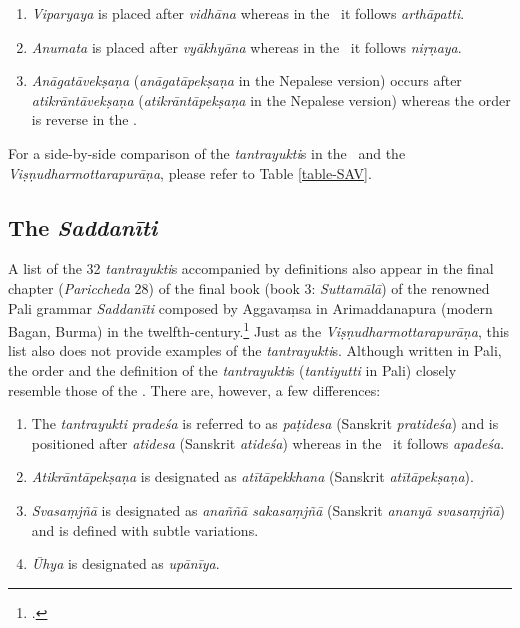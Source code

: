 \begin{enumerate}

	\item \emph{Viparyaya} is placed after \emph{vidhāna} whereas in the \SS\  it 
	follows \emph{arthāpatti}.
	
	\item \emph{Anumata} is placed after \emph{vyākhyāna} whereas in the \SS\ it  
	follows \emph{niṛṇaya}.

	\item \emph{Anāgatāvekṣaṇa} (\emph{anāgatāpekṣaṇa} in the Nepalese 
	version) occurs after \emph{atikrāntāvekṣaṇa} (\emph{atikrāntāpekṣaṇa} in the 
	Nepalese version) whereas the order is reverse in the \SS.
	
\end{enumerate}

For a side-by-side comparison of the \emph{tantrayukti}s in the \SS\  and the 
\emph{Viṣṇudharmottarapurāṇa}, please refer to Table \ref{table-SAV}.


\subsection{The \emph{Saddanīti}}
A list of the 32 \emph{tantrayukti}s accompanied by definitions also appear in the final chapter (\emph{Pariccheda} 28) of the final book (book 3: \emph{Suttamālā}) of the renowned Pali grammar \emph{Saddanīti} composed by Aggavaṃsa in Arimaddanapura (modern Bagan, Burma) in the twelfth-century.\footnote{\cite[920--921]{smit-1930}.} Just as the \emph{Viṣṇudharmottarapurāṇa}, this list also does not provide examples of the \emph{tantrayukti}s. Although written in Pali, the order and the definition of the \emph{tantrayukti}s (\emph{tantiyutti} in Pali) closely resemble those of the \SS. There are, however, a few differences:

	\begin{enumerate}

\item The \emph{tantrayukti} \emph{pradeśa} is referred to as \emph{paṭidesa} (Sanskrit \emph{pratideśa}) and is positioned after \emph{atidesa} (Sanskrit \emph{atideśa}) whereas in the \SS\ it follows \emph{apadeśa}. 

\item \emph{Atikrāntāpekṣaṇa} is designated as \emph{atītāpekkhana} (Sanskrit \emph{atītāpekṣaṇa}).

\item \emph{Svasaṃjñā} is designated as \emph{anaññā sakasaṃjñā} (Sanskrit \emph{ananyā svasaṃjñā}) and is defined with subtle variations.

\item \emph{Ūhya} is designated as \emph{upānīya}. 
	
	\end{enumerate}

